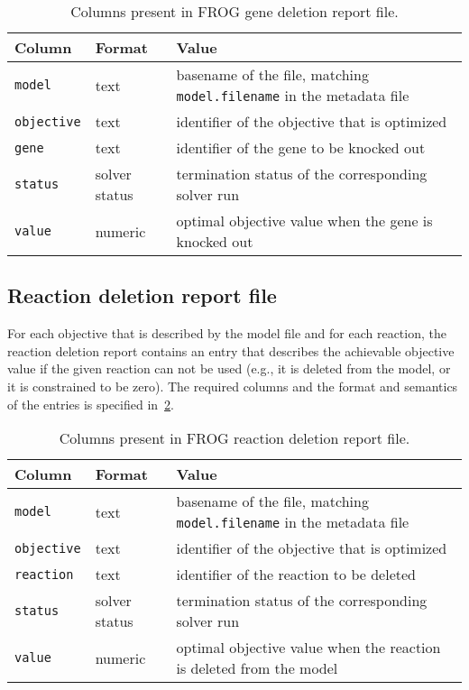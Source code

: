 \begin{table}[p]\tablefont
\begin{tabular}{llp{30em}}
\toprule
Column & Format & Value \\
\midrule
\verb|model|
 & text
 & basename of the file, matching \verb|model.filename| in the metadata file
 \\
\verb|objective|
 & text
 & identifier of the objective that is optimized
 \\
\verb|gene|
 & text
 & identifier of the gene to be knocked out
 \\
\verb|status|
 & solver status
 & termination status of the corresponding solver run
 \\
\verb|value|
 & numeric
 & optimal objective value when the gene is knocked out
 \\
\bottomrule
\end{tabular}
\caption{Columns present in FROG gene deletion report file.}
\label{tab:genefields}
\end{table}

\subsection{Reaction deletion report file}
\label{sec:rxns}

For each objective that is described by the model file and for each reaction, the reaction deletion report contains an entry that describes the achievable objective value if the given reaction can not be used (e.g., it is deleted from the model, or it is constrained to be zero). The required columns and the format and semantics of the entries is specified in~\cref{tab:rxnsfields}.

\begin{table}[p]\tablefont
\begin{tabular}{llp{30em}}
\toprule
Column & Format & Value \\
\midrule
\verb|model|
 & text
 & basename of the file, matching \verb|model.filename| in the metadata file
 \\
\verb|objective|
 & text
 & identifier of the objective that is optimized
 \\
\verb|reaction|
 & text
 & identifier of the reaction to be deleted
 \\
\verb|status|
 & solver status
 & termination status of the corresponding solver run
 \\
\verb|value|
 & numeric
 & optimal objective value when the reaction is deleted from the model
 \\
\bottomrule
\end{tabular}
\caption{Columns present in FROG reaction deletion report file.}
\label{tab:rxnsfields}
\end{table}
